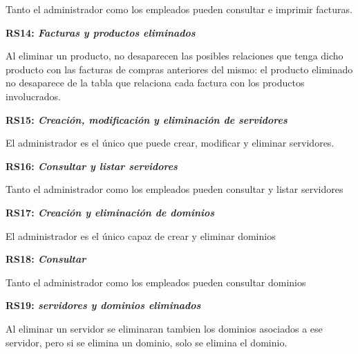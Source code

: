 \documentclass[paper=a4, fontsize=11pt, spanish]{scrartcl}
\begin{document}
Tanto el administrador como los empleados pueden consultar e imprimir facturas.

\setlength{\parindent}{0em}
\textbf{RS14: \textit{Facturas y productos eliminados}}
\setlength{\parindent}{2em}

Al eliminar un producto, no desaparecen las posibles relaciones que tenga dicho producto con las facturas de compras anteriores del mismo: el producto eliminado no desaparece de la tabla que relaciona cada factura con los productos involucrados.

\setlength{\parindent}{0em}
\textbf{RS15: \textit{Creación, modificación  y eliminación de servidores}}
\setlength{\parindent}{2em}

El administrador es el único que puede crear, modificar y eliminar servidores. 

\setlength{\parindent}{0em}
\textbf{RS16: \textit{Consultar y listar servidores}}
\setlength{\parindent}{2em}

Tanto el administrador como los empleados pueden consultar y listar servidores

\setlength{\parindent}{0em}
\textbf{RS17: \textit{Creación y eliminación de dominios}}
\setlength{\parindent}{2em}

El administrador es el único capaz de crear y eliminar dominios

\setlength{\parindent}{0em}
\textbf{RS18: \textit{Consultar}}
\setlength{\parindent}{2em}

Tanto el administrador como los empleados pueden consultar dominios

\setlength{\parindent}{0em}
\textbf{RS19: \textit{servidores y dominios eliminados}}
\setlength{\parindent}{2em}

Al eliminar un servidor se eliminaran tambien los dominios asociados a ese servidor, pero si se elimina un dominio, solo se elimina el dominio. 
\end{document}

